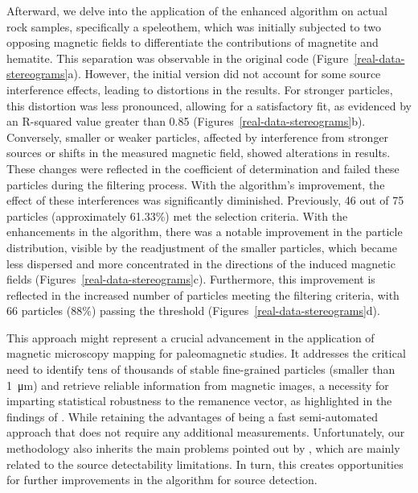 Afterward, we delve into the application of the enhanced algorithm on actual rock samples, specifically a speleothem, which was initially subjected to two opposing magnetic fields to differentiate the contributions of magnetite and hematite. This separation was observable in the original code (Figure~\ref{real-data-stereograms}a). However, the initial version did not account for some source interference effects, leading to distortions in the results. For stronger particles, this distortion was less pronounced, allowing for a satisfactory fit, as evidenced by an R-squared value greater than 0.85 (Figures~\ref{real-data-stereograms}b). Conversely, smaller or weaker particles, affected by interference from stronger sources or shifts in the measured magnetic field, showed alterations in results. These changes were reflected in the coefficient of determination and failed these particles during the filtering process. With the algorithm's improvement, the effect of these interferences was significantly diminished. Previously, 46 out of 75 particles (approximately 61.33\%) met the selection criteria. With the enhancements in the algorithm, there was a notable improvement in the particle distribution, visible by the readjustment of the smaller particles, which became less dispersed and more concentrated in the directions of the induced magnetic fields (Figures~\ref{real-data-stereograms}c). Furthermore, this improvement is reflected in the increased number of particles meeting the filtering criteria, with 66 particles (88\%) passing the threshold (Figures~\ref{real-data-stereograms}d).

This approach might represent a crucial advancement in the application of magnetic microscopy mapping for paleomagnetic studies. It addresses the critical need to identify tens of thousands of stable fine-grained particles (smaller than \SI{1}{\micro\meter}) and retrieve reliable information from magnetic images, a necessity for imparting statistical robustness to the remanence vector, as highlighted in the findings of \cite{Berndt2016}. While retaining the advantages of being a fast semi-automated approach that does not require any additional measurements. Unfortunately, our methodology also inherits the main problems pointed out by \citet{Souza-Junior2023b}, which are mainly related to the source detectability limitations. In turn, this creates opportunities for further improvements in the algorithm for source detection.





